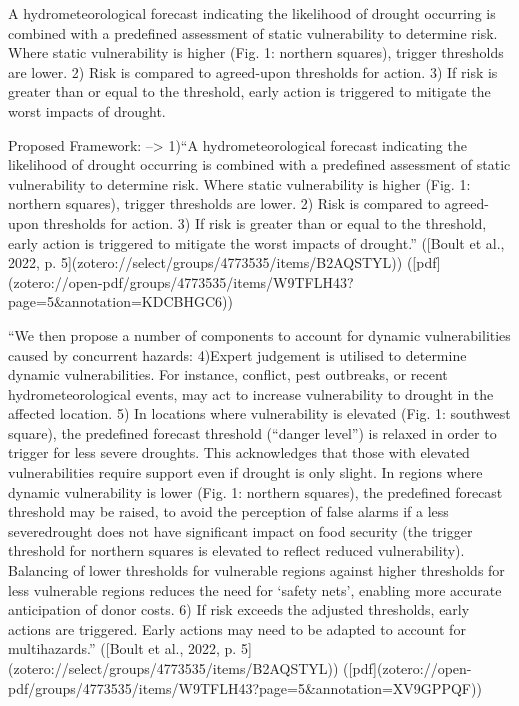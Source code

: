{A hydrometeorological forecast indicating the likelihood of drought occurring is combined with a predefined assessment of static vulnerability to determine risk. Where static vulnerability is higher (Fig. 1: northern squares), trigger thresholds are lower. 2) Risk is compared to agreed-upon thresholds for action. 3) If risk is greater than or equal to the threshold, early action is triggered to mitigate the worst impacts of drought.

Proposed Framework:
--> 1)“A hydrometeorological forecast indicating the likelihood of drought occurring is combined with a predefined assessment of static vulnerability to determine risk. Where static vulnerability is higher (Fig. 1: northern squares), trigger thresholds are lower.
2) Risk is compared to agreed-upon thresholds for action.
3) If risk is greater than or equal to the threshold, early action is triggered to mitigate the worst impacts of drought.” ([Boult et al., 2022, p. 5](zotero://select/groups/4773535/items/B2AQSTYL)) ([pdf](zotero://open-pdf/groups/4773535/items/W9TFLH43?page=5&annotation=KDCBHGC6))

“We then propose a number of components to account for dynamic vulnerabilities caused by concurrent hazards:
4)Expert judgement is utilised to determine dynamic vulnerabilities. For instance, conflict, pest outbreaks, or recent hydrometeorological events, may act to increase vulnerability to drought in the affected location.
5) In locations where vulnerability is elevated (Fig. 1: southwest square), the predefined forecast threshold (“danger level”) is relaxed in order to trigger for less severe droughts. This acknowledges that those with elevated vulnerabilities require support even if drought is only slight. In regions where dynamic vulnerability is lower (Fig. 1: northern squares), the predefined forecast threshold may be raised, to avoid the perception of false alarms if a less severedrought does not have significant impact on food security (the trigger threshold for northern squares is elevated to reflect reduced vulnerability). Balancing of lower thresholds for vulnerable regions against higher thresholds for less vulnerable regions reduces the need for ‘safety nets’, enabling more accurate anticipation of donor costs.
6) If risk exceeds the adjusted thresholds, early actions are triggered. Early actions may need to be adapted to account for multihazards.” ([Boult et al., 2022, p. 5](zotero://select/groups/4773535/items/B2AQSTYL)) ([pdf](zotero://open-pdf/groups/4773535/items/W9TFLH43?page=5&annotation=XV9GPPQF))


}
